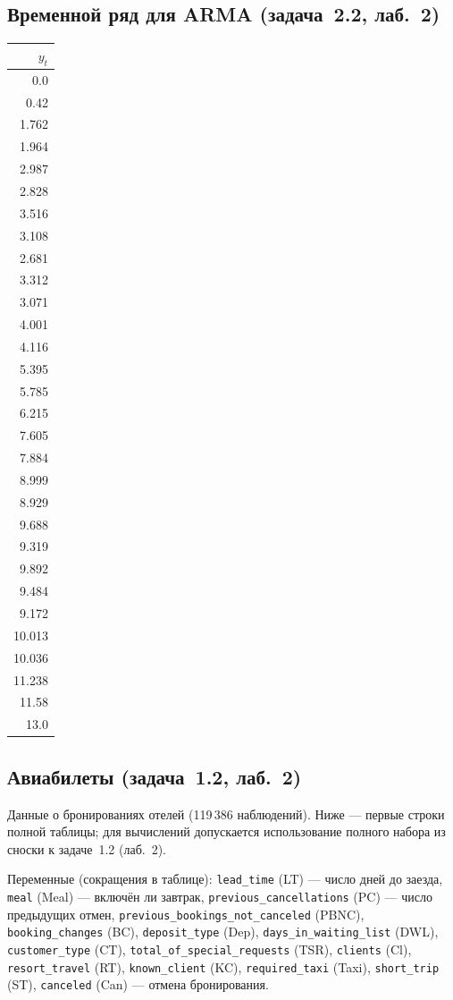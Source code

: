 \subsection{Временной ряд для ARMA (задача~2.2, лаб.~2)}
\label{app:data-arma}
\begin{center}
\footnotesize
\begin{tabular}{@{}r@{}}
 \toprule
\textbf{$y_t$} \\
 \midrule
0.0 \\
0.42 \\
1.762 \\
1.964 \\
2.987 \\
2.828 \\
3.516 \\
3.108 \\
2.681 \\
3.312 \\
3.071 \\
4.001 \\
4.116 \\
5.395 \\
5.785 \\
6.215 \\
7.605 \\
7.884 \\
8.999 \\
8.929 \\
9.688 \\
9.319 \\
9.892 \\
9.484 \\
9.172 \\
10.013 \\
10.036 \\
11.238 \\
11.58 \\
13.0 \\
 \bottomrule
\end{tabular}
\end{center}

\subsection{Авиабилеты (задача~1.2, лаб.~2)}
\label{app:data-flights}

Данные о бронированиях отелей (119\,386 наблюдений). Ниже --- первые строки полной таблицы; для вычислений допускается использование полного набора из сноски к задаче~1.2 (лаб.~2).

Переменные (сокращения в таблице): \texttt{lead\_time} (LT) --- число дней до заезда, \texttt{meal} (Meal) --- включён ли завтрак, \texttt{previous\_cancellations} (PC) --- число предыдущих отмен, \texttt{previous\_bookings\_not\_canceled} (PBNC), \texttt{booking\_changes} (BC), \texttt{deposit\_type} (Dep), \texttt{days\_in\_waiting\_list} (DWL), \texttt{customer\_type} (CT), \texttt{total\_of\_special\_requests} (TSR), \texttt{clients} (Cl), \texttt{resort\_travel} (RT), \texttt{known\_client} (KC), \texttt{required\_taxi} (Taxi), \texttt{short\_trip} (ST), \texttt{canceled} (Can) --- отмена бронирования.

